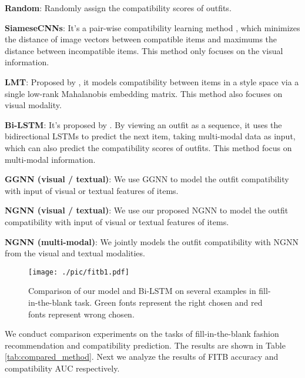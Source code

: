 \documentclass[sigconf]{acmart}
\begin{document}
\noindent\textbf{Random}: Randomly assign the compatibility scores of outfits.

\noindent\textbf{SiameseCNNs}: It's a pair-wise compatibility learning method \cite{veit2015learning}, which minimizes the distance of image vectors between compatible items and maximums the distance between incompatible items. This method only focuses on the visual information.

\noindent\textbf{LMT}: Proposed by \cite{mcauley2015image}, it models compatibility between items in a style space via a single low-rank Mahalanobis embedding matrix. This method also focuses on visual modality.

\noindent\textbf{Bi-LSTM}: It's proposed by \cite{han2017learning}. By viewing an outfit as a sequence, it uses the bidirectional LSTMs to predict the next item, taking multi-modal data as input, which can also predict the compatibility scores of outfits. This method focus on multi-modal information.

 \noindent\textbf{GGNN (visual / textual)}: We use GGNN to model the outfit compatibility with input of visual or textual features of items.

\noindent\textbf{NGNN (visual / textual)}: We use our proposed NGNN to model the outfit compatibility with input of visual or textual features of items.

\noindent\textbf{NGNN (multi-modal)}: We jointly models the outfit compatibility with NGNN from the visual and textual modalities.

\begin{figure}[t]
  \centering
\texttt{[image: ./pic/fitb1.pdf]}
  \caption{Comparison of our model and Bi-LSTM on several examples in fill-in-the-blank task. Green fonts represent the right chosen and red fonts represent wrong chosen. }\label{fig:fill_blank}
\end{figure}



We conduct comparison experiments on the tasks of fill-in-the-blank fashion recommendation and compatibility prediction. The results are shown in Table \ref{tab:compared_method}. Next we analyze the results of FITB accuracy and compatibility AUC respectively.
\end{document}
